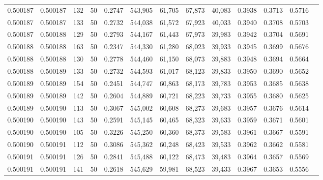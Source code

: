 \begin{tabular}{rrrrrrrrrrrrr}
0.500187 & 0.500187 &   132 &  50 &                                     0.2747 & 543,905 &  61,705 &  67,873 &  40,083 & 0.3938 & 0.3713 & 0.5716 \\
0.500187 & 0.500187 &   133 &  50 &                                     0.2732 & 544,038 &  61,572 &  67,923 &  40,033 & 0.3940 & 0.3708 & 0.5703 \\
0.500187 & 0.500188 &   129 &  50 &                                     0.2793 & 544,167 &  61,443 &  67,973 &  39,983 & 0.3942 & 0.3704 & 0.5691 \\
0.500188 & 0.500188 &   163 &  50 &                                     0.2347 & 544,330 &  61,280 &  68,023 &  39,933 & 0.3945 & 0.3699 & 0.5676 \\
0.500188 & 0.500188 &   130 &  50 &                                     0.2778 & 544,460 &  61,150 &  68,073 &  39,883 & 0.3948 & 0.3694 & 0.5664 \\
0.500188 & 0.500189 &   133 &  50 &                                     0.2732 & 544,593 &  61,017 &  68,123 &  39,833 & 0.3950 & 0.3690 & 0.5652 \\
0.500189 & 0.500189 &   154 &  50 &                                     0.2451 & 544,747 &  60,863 &  68,173 &  39,783 & 0.3953 & 0.3685 & 0.5638 \\
0.500189 & 0.500189 &   142 &  50 &                                     0.2604 & 544,889 &  60,721 &  68,223 &  39,733 & 0.3955 & 0.3680 & 0.5625 \\
0.500189 & 0.500190 &   113 &  50 &                                     0.3067 & 545,002 &  60,608 &  68,273 &  39,683 & 0.3957 & 0.3676 & 0.5614 \\
0.500190 & 0.500190 &   143 &  50 &                                     0.2591 & 545,145 &  60,465 &  68,323 &  39,633 & 0.3959 & 0.3671 & 0.5601 \\
0.500190 & 0.500190 &   105 &  50 &                                     0.3226 & 545,250 &  60,360 &  68,373 &  39,583 & 0.3961 & 0.3667 & 0.5591 \\
0.500190 & 0.500191 &   112 &  50 &                                     0.3086 & 545,362 &  60,248 &  68,423 &  39,533 & 0.3962 & 0.3662 & 0.5581 \\
0.500191 & 0.500191 &   126 &  50 &                                     0.2841 & 545,488 &  60,122 &  68,473 &  39,483 & 0.3964 & 0.3657 & 0.5569 \\
0.500191 & 0.500191 &   141 &  50 &                                     0.2618 & 545,629 &  59,981 &  68,523 &  39,433 & 0.3967 & 0.3653 & 0.5556 \\

\end{tabular}
